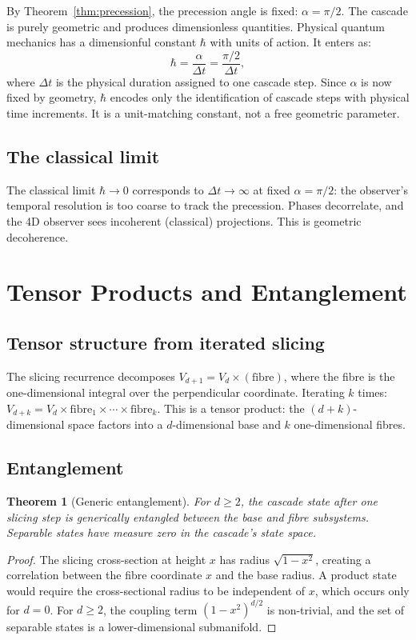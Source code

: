 \documentclass[12pt,a4paper]{article}
\newtheorem{theorem}{Theorem}[section]
\begin{document}
By Theorem~\ref{thm:precession}, the precession angle is fixed: $\alpha=\pi/2$. The cascade
is purely geometric and produces dimensionless quantities. Physical quantum mechanics has a
dimensionful constant $\hbar$ with units of action. It enters as:
\[
\hbar = \frac{\alpha}{\Delta t} = \frac{\pi/2}{\Delta t},
\]
where $\Delta t$ is the physical duration assigned to one cascade step. Since $\alpha$ is
now fixed by geometry, $\hbar$ encodes only the identification of cascade steps with
physical time increments. It is a unit-matching constant, not a free geometric parameter.

\subsection{The classical limit}

The classical limit $\hbar\to 0$ corresponds to $\Delta t\to\infty$ at fixed
$\alpha=\pi/2$: the observer's temporal resolution is too coarse to track the precession.
Phases decorrelate, and the 4D observer sees incoherent (classical) projections. This is
geometric decoherence.

\section{Tensor Products and Entanglement}

\subsection{Tensor structure from iterated slicing}

The slicing recurrence decomposes $V_{d+1}=V_d\times(\text{fibre})$, where the fibre is
the one-dimensional integral over the perpendicular coordinate. Iterating $k$ times:
$V_{d+k}=V_d\times\text{fibre}_1\times\cdots\times\text{fibre}_k$. This is a tensor
product: the $(d+k)$-dimensional space factors into a $d$-dimensional base and $k$
one-dimensional fibres.

\subsection{Entanglement}

\begin{theorem}[Generic entanglement]\label{thm:entangle}
For $d\geq 2$, the cascade state after one slicing step is generically entangled between
the base and fibre subsystems. Separable states have measure zero in the cascade's state
space.
\end{theorem}
\begin{proof}
The slicing cross-section at height $x$ has radius $\sqrt{1-x^2}$, creating a correlation
between the fibre coordinate $x$ and the base radius. A product state would require the
cross-sectional radius to be independent of $x$, which occurs only for $d=0$. For $d\geq 2$,
the coupling term $(1-x^2)^{d/2}$ is non-trivial, and the set of separable states is a
lower-dimensional submanifold.
\end{proof}
\end{document}
